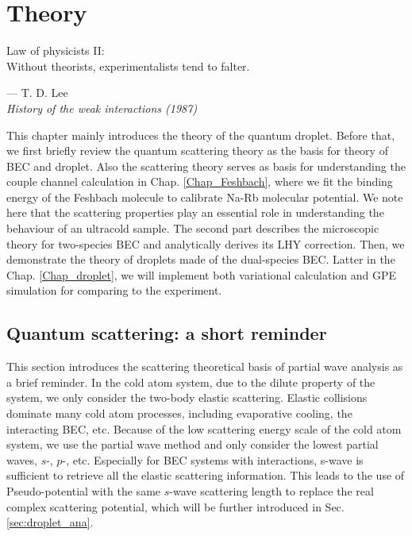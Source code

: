 \chapter{Theory}
\label{Chap:theory}

\setlength{\unitlength}{1pt}
\setlength{\epigraphwidth}{10cm}
\epigraph{Law of physicists II: \\ Without theorists, experimentalists tend to falter. \cite{Lee:1992ui}}{--- T. D. Lee\\ \textit{History of the weak interactions (1987)}}

This chapter mainly introduces the theory of the quantum droplet. Before that, we first briefly review the quantum scattering theory as the basis for theory of BEC and droplet. Also the scattering theory serves as basis for understanding the couple channel calculation in Chap. \ref{Chap_Feshbach}, where we fit the binding energy of the Feshbach molecule to calibrate Na-Rb molecular potential. We note here that the scattering properties play an essential role in understanding the behaviour of an ultracold sample. The second part describes the microscopic theory for two-species BEC and analytically derives its LHY correction. Then, we demonstrate the theory of droplets made of the dual-species BEC. Latter in the Chap. \ref{Chap_droplet}, we will implement both variational calculation and GPE simulation for comparing to the experiment.

\section{Quantum scattering: a short reminder}
\label{sec:quan_scat}

This section introduces the scattering theoretical basis of partial wave analysis as a brief reminder. In the cold atom system, due to the dilute property of the system, we only consider the two-body elastic scattering. Elastic collisions dominate many cold atom processes, including evaporative cooling, the interacting BEC, etc. Because of the low scattering energy scale of the cold atom system, we use the partial wave method and only consider the lowest partial waves, $s$-, $p$-, etc. Especially for BEC systems with interactions, s-wave is sufficient to retrieve all the elastic scattering information. This leads to the use of Pseudo-potential with the same $s$-wave scattering length to replace the real complex scattering potential, which will be further introduced in Sec. \ref{sec:droplet_ana}.

